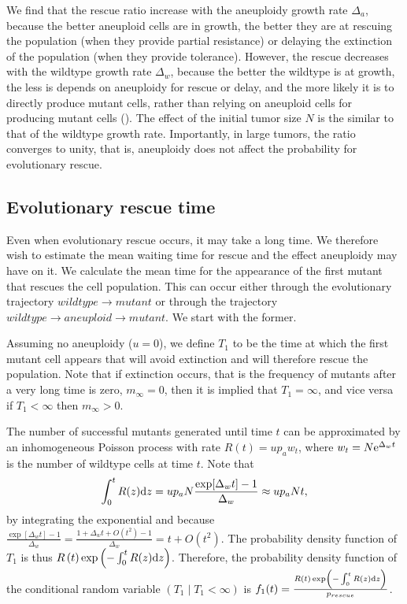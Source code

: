 \documentclass[12pt]{extarticle}
\renewcommand{\d}[1]{\ensuremath{\operatorname{d}\!{#1}}}
\renewcommand{\d}{{\rm d}}
\newcommand{\e}{{\rm e}}
\begin{document}
We find that the rescue ratio increase with the aneuploidy growth rate $\Delta_a$, because the better aneuploid cells are in growth, the better they are at rescuing the population (when they provide partial resistance) or delaying the extinction of the population (when they provide tolerance). 
However, the rescue decreases with the wildtype growth rate $\Delta_w$, because the better the wildtype is at growth, the less is depends on aneuploidy for rescue or delay, and the more likely it is to directly produce mutant cells, rather than relying on aneuploid cells for producing mutant cells ().
The effect of the initial tumor size $N$ is the similar to that of the wildtype growth rate. 
Importantly, in large tumors, the ratio converges to unity, that is, aneuploidy does not affect the probability for evolutionary rescue. %


\subsection*{Evolutionary rescue time}

Even when evolutionary rescue occurs, it may take a long time.
We therefore wish to estimate the mean waiting time for rescue and the effect aneuploidy may have on it. 
We calculate the mean time for the appearance of the first mutant that rescues the cell population.
This can occur either through the evolutionary trajectory $wildtype \rightarrow mutant$ or through the trajectory $wildtype \rightarrow aneuploid \rightarrow mutant$.
We start with the former. 

Assuming no aneuploidy ($u=0$), we define $T_1$ to be the time at which the first mutant cell appears that will avoid extinction and will therefore rescue the population.
Note that if extinction occurs, that is the frequency of mutants after a very long time is zero, $m_{\infty}=0$, then it is implied that $T_1=\infty$, and vice versa if $T_1<\infty$ then $m_{\infty}>0$.

The number of successful mutants generated until time $t$ can be approximated by an inhomogeneous Poisson process with rate $R\left(t\right) = u p_a w_t$,
where $w_t=N\e^{\Delta_w t}$ is the number of wildtype cells at time $t$.
Note that 
\begin{equation}\label{integralR}
\int_0^{t}{R(z)\d z} = 
u p_a N \frac{\exp[{\Delta_w t}]-1}{\Delta_w} \approx 
u p_a N t,
\end{equation}
by integrating the exponential and because $\frac{\exp[\Delta_w t]-1}{\Delta_w}=\frac{1+\Delta_w t+O(t^2)-1}{\Delta_w}=t+O(t^2)$.
The probability density function of $T_1$ is thus
$R\left(t\right)\exp\left(-\int_0^{t}{R(z)\d z}\right)$. %
Therefore, the probability density function of the conditional random variable $(T_1 \mid T_1 < \infty)$ is
$f_1(t) = \frac{R\left(t\right)\exp\left(-\int_0^{t}{R(z)\d z}\right)}{p_{rescue}}$. 
\\
\end{document}
